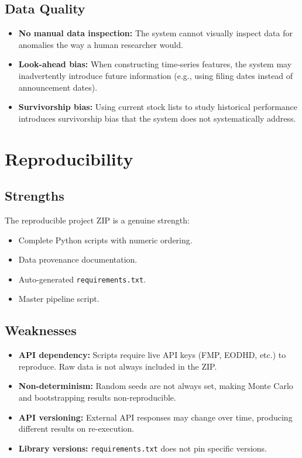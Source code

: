 \subsection{Data Quality}

\begin{itemize}
  \item \textbf{No manual data inspection:} The system cannot visually inspect data for anomalies the way a human researcher would.
  \item \textbf{Look-ahead bias:} When constructing time-series features, the system may inadvertently introduce future information (e.g., using filing dates instead of announcement dates).
  \item \textbf{Survivorship bias:} Using current stock lists to study historical performance introduces survivorship bias that the system does not systematically address.
\end{itemize}

\section{Reproducibility}
\label{sec:weak:reproducibility}

\subsection{Strengths}

The reproducible project ZIP is a genuine strength:
\begin{itemize}
  \item Complete Python scripts with numeric ordering.
  \item Data provenance documentation.
  \item Auto-generated \texttt{requirements.txt}.
  \item Master pipeline script.
\end{itemize}

\subsection{Weaknesses}

\begin{itemize}
  \item \textbf{API dependency:} Scripts require live API keys (FMP, EODHD, etc.) to reproduce. Raw data is not always included in the ZIP.
  \item \textbf{Non-determinism:} Random seeds are not always set, making Monte Carlo and bootstrapping results non-reproducible.
  \item \textbf{API versioning:} External API responses may change over time, producing different results on re-execution.
  \item \textbf{Library versions:} \texttt{requirements.txt} does not pin specific versions.
\end{itemize}

